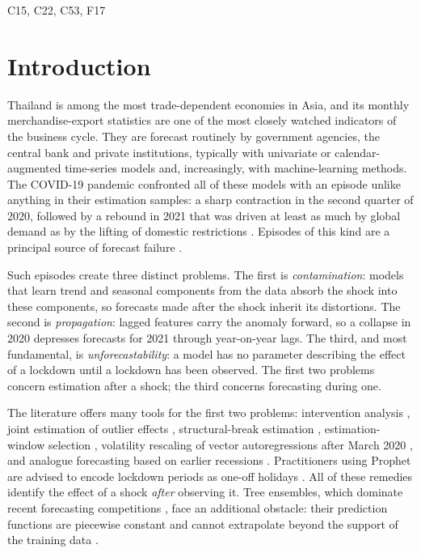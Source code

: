 \documentclass{article}
\theoremstyle{plain}
\theoremstyle{definition}
\theoremstyle{remark}
\begin{document}

\enspace C15, C22, C53, F17

\section{Introduction}\label{sec:intro}
Thailand is among the most trade-dependent economies in Asia, and its monthly merchandise-export statistics are one of the most closely watched indicators of the business cycle. They are forecast routinely by government agencies, the central bank and private institutions, typically with univariate or calendar-augmented time-series models and, increasingly, with machine-learning methods. The COVID-19 pandemic confronted all of these models with an episode unlike anything in their estimation samples: a sharp contraction in the second quarter of 2020, followed by a rebound in 2021 that was driven at least as much by global demand as by the lifting of domestic restrictions \citep{baldwin2020trade}. Episodes of this kind are a principal source of forecast failure \citep{clements1998forecasting, rossi2013instability}.

Such episodes create three distinct problems. The first is \emph{contamination}: models that learn trend and seasonal components from the data absorb the shock into these components, so forecasts made after the shock inherit its distortions. The second is \emph{propagation}: lagged features carry the anomaly forward, so a collapse in 2020 depresses forecasts for 2021 through year-on-year lags. The third, and most fundamental, is \emph{unforecastability}: a model has no parameter describing the effect of a lockdown until a lockdown has been observed. The first two problems concern estimation after a shock; the third concerns forecasting during one.

The literature offers many tools for the first two problems: intervention analysis \citep{box1975intervention}, joint estimation of outlier effects \citep{chen1993joint}, structural-break estimation \citep{bai1998multiple}, estimation-window selection \citep{pesaran2007window}, volatility rescaling of vector autoregressions after March 2020 \citep{lenza2022var}, and analogue forecasting based on earlier recessions \citep{foroni2022covid}. Practitioners using Prophet are advised to encode lockdown periods as one-off holidays \citep{prophetshocks}. All of these remedies identify the effect of a shock \emph{after} observing it. Tree ensembles, which dominate recent forecasting competitions \citep{makridakis2022m5}, face an additional obstacle: their prediction functions are piecewise constant and cannot extrapolate beyond the support of the training data \citep{hastie2009elements, januschowski2022trees}.
\end{document}
